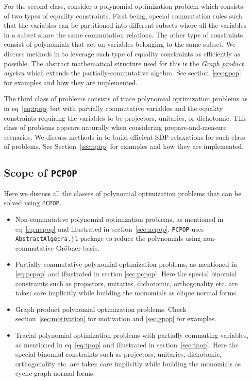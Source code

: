 For the second class, consider a polynomial optimization problem which consists of two types of equality constraints. First being, special commutation rules such that the variables can be partitioned into different subsets where all the variables in a subset share the same commutation relations. The other type of constraints consist of polynomials that act on variables belonging to the same subset. We discuss methods in \cite{} to leverage such type of equality constraints as efficiently as possible. The abstract mathematical structure used for this is the \emph{Graph product algebra} which extends the partially-commutative algebra. See section~\ref{sec:gpop} for examples and how they are implemented.

The third class of problems consists of trace polynomial optimization problems as in eq~\ref{eq:tpop} but with partially commutative variables and the equality constraints requiring the variables to be projectors, unitaries, or dichotomic. This class of problems appears naturally when considering prepare-and-measure scenarios. We discuss methods in \cite{} to build efficient SDP relaxations for such class of problems. See Section~\ref{sec:tpop} for examples and how they are implemented.

\subsection{Scope of \texttt{PCPOP}}
Here we discuss all the classes of polynomial optimization problems that can be solved using \texttt{PCPOP}.
\begin{itemize}
  \item Non-commutative polynomial optimization problems, as mentioned in eq~\ref{eq:ncpop} and illustrated in section~\ref{sec:ncpop}. \texttt{PCPOP} uses \texttt{AbstractAlgebra.jl} package to reduce the polynomials using non-commutative Gr\"obner basis. 
  \item Partially-commutative polynomial optimization problems, as mentioned in \ref{eq:pcpop} and illustrated in section \ref{sec:pcpop}. Here the special binomial constraints such as projectors, unitaries, dichotomic, orthogonality  etc. are taken care implicitly while building the monomials as clique normal forms.
  \item Graph product polynomial optimization problems. Check section~\ref{sec:motivation} for motivation and \ref{sec:gpop} for examples.
  \item Tracial polynomial optimization problems with partially commuting variables, as mentioned in eq~\ref{eq:tpop} and illustrated in section~\ref{sec:tpop}. Here the special binomial constraints such as projectors, unitaries, dichotomic, orthogonality  etc. are taken care implicitly while building the monomials as cyclic graph normal forms.
\end{itemize}
